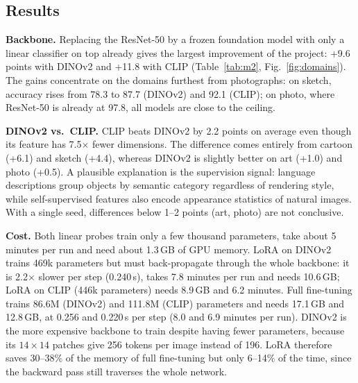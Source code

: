 \documentclass[conference]{IEEEtran}
\begin{document}
\subsection{Results}
\textbf{Backbone.} Replacing the ResNet-50 by a frozen foundation model with only a linear classifier on top already gives the largest improvement of the project: +9.6 points with DINOv2 and +11.8 with CLIP (Table~\ref{tab:m2}, Fig.~\ref{fig:domains}). The gains concentrate on the domains furthest from photographs: on sketch, accuracy rises from 78.3 to 87.7 (DINOv2) and 92.1 (CLIP); on photo, where ResNet-50 is already at 97.8, all models are close to the ceiling.

\textbf{DINOv2 vs.\ CLIP.} CLIP beats DINOv2 by 2.2 points on average even though its feature has 7.5$\times$ fewer dimensions. The difference comes entirely from cartoon (+6.1) and sketch (+4.4), whereas DINOv2 is slightly better on art (+1.0) and photo (+0.5). A plausible explanation is the supervision signal: language descriptions group objects by semantic category regardless of rendering style, while self-supervised features also encode appearance statistics of natural images. With a single seed, differences below 1--2 points (art, photo) are not conclusive.

\textbf{Cost.} Both linear probes train only a few thousand parameters, take about 5 minutes per run and need about 1.3\,GB of GPU memory. LoRA on DINOv2 trains 469k parameters but must back-propagate through the whole backbone: it is 2.2$\times$ slower per step (0.240\,s), takes 7.8 minutes per run and needs 10.6\,GB; LoRA on CLIP (446k parameters) needs 8.9\,GB and 6.2 minutes. Full fine-tuning trains 86.6M (DINOv2) and 111.8M (CLIP) parameters and needs 17.1\,GB and 12.8\,GB, at 0.256 and 0.220\,s per step (8.0 and 6.9 minutes per run). DINOv2 is the more expensive backbone to train despite having fewer parameters, because its $14\times14$ patches give 256 tokens per image instead of 196. LoRA therefore saves 30--38\% of the memory of full fine-tuning but only 6--14\% of the time, since the backward pass still traverses the whole network.
\end{document}
